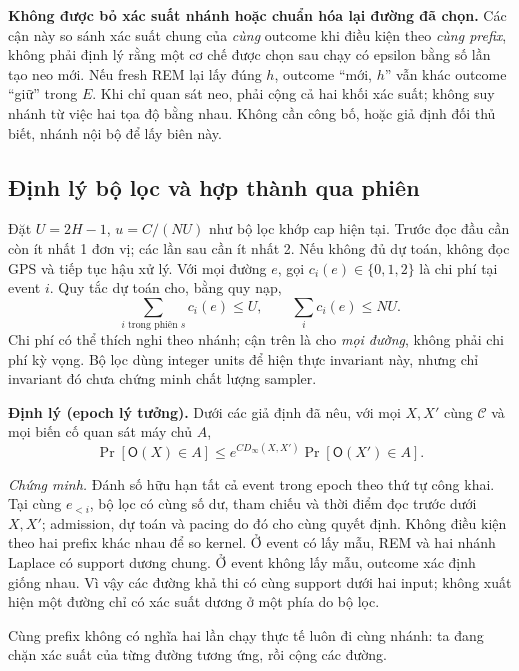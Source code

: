 \textbf{Không được bỏ xác suất nhánh hoặc chuẩn hóa lại đường đã chọn.}
Các cận này so sánh xác suất chung của \emph{cùng} outcome khi điều kiện
theo \emph{cùng prefix}, không phải định lý rằng một cơ chế được chọn sau
chạy có epsilon bằng số lần tạo neo mới. Nếu fresh REM lại lấy đúng $h$,
outcome ``mới, $h$'' vẫn khác outcome ``giữ'' trong $E$. Khi chỉ quan sát
neo, phải cộng cả hai khối xác suất; không suy nhánh từ việc hai tọa độ bằng
nhau. Không cần công bố, hoặc giả định đối thủ biết, nhánh nội bộ để lấy
biên này.

\subsection{Định lý bộ lọc và hợp thành qua phiên}
\label{sec:formal-adaptive-cap}

Đặt $U=2H-1$, $u=C/(NU)$ như bộ lọc khớp cap hiện tại. Trước đọc đầu cần
còn ít nhất 1 đơn vị; các lần sau cần ít nhất 2. Nếu không đủ dự toán, không
đọc GPS và tiếp tục hậu xử lý. Với mọi đường $e$, gọi
$c_i(e)\in\{0,1,2\}$ là chi phí tại event $i$. Quy tắc dự toán cho, bằng
quy nạp,
\begin{equation}
 \sum_{i\text{ trong phiên }s}c_i(e)\leq U,
 \qquad \sum_i c_i(e)\leq NU.
 \label{eq:formal-pathwise-cap}
\end{equation}
Chi phí có thể thích nghi theo nhánh; cận trên là cho \emph{mọi đường},
không phải chi phí kỳ vọng. Bộ lọc dùng integer units để hiện thực invariant
này, nhưng chỉ invariant đó chưa chứng minh chất lượng sampler.

\noindent\textbf{Định lý (epoch lý tưởng).} Dưới các giả định đã nêu, với
mọi $X,X'$ cùng $\mathcal C$ và mọi biến cố quan sát máy chủ $A$,
\begin{equation}
 \Pr[\mathsf O(X)\in A]
 \leq e^{C D_\infty(X,X')}\Pr[\mathsf O(X')\in A].
 \label{eq:current-transcript-bound}
\end{equation}

\noindent\emph{Chứng minh.} Đánh số hữu hạn tất cả event trong epoch theo
thứ tự công khai. Tại cùng $e_{<i}$, bộ lọc có cùng số dư, tham chiếu và
thời điểm đọc trước dưới $X,X'$; admission, dự toán và pacing do đó cho
cùng quyết định. Không điều kiện theo hai prefix khác nhau để so kernel.
Ở event có lấy mẫu, REM và hai nhánh Laplace có support dương chung. Ở
event không lấy mẫu, outcome xác định giống nhau. Vì vậy các đường khả thi
có cùng support dưới hai input; không xuất hiện một đường chỉ có xác suất
dương ở một phía do bộ lọc.

Cùng prefix không có nghĩa hai lần chạy thực tế luôn đi cùng nhánh: ta
đang chặn xác suất của từng đường tương ứng, rồi cộng các đường.

